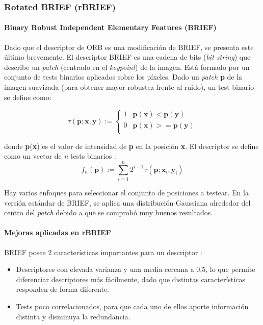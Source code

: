 \subsubsection{Rotated BRIEF (rBRIEF)}

\paragraph{Binary Robust Independent Elementary Features (BRIEF)}

Dado que el descriptor de ORB es una modificación de BRIEF, se presenta este último brevemente. El descriptor BRIEF \cite{Calonder12} es una cadena de bits (\textit{bit string}) que describe un \textit{patch} (centrado en el \textit{\textsl{keypoint}}) de la imagen. Está formado por un conjunto de tests binarios aplicados sobre los píxeles. Dado un \textit{patch} \textbf{p} de la imagen suavizada (para obtener mayor robustez frente al ruido), un test binario se define como:

\begin{equation}
\tau(\textbf{p}; \textbf{x}, \textbf{y}) := \left\lbrace
\begin{array}{cc}
1 & \textbf{p}(\textbf{x}) < \textbf{p}(\textbf{y}) \\
0 & \textbf{p}(\textbf{x}) >= \textbf{p}(\textbf{y}) \\
\end{array}
\right.
\end{equation}

donde \textbf{p}(\textbf{x}) es el valor de intensidad de \textbf{p} en la posición \textbf{x}.
El descriptor se define como un vector de \textsl{n} tests binarios :
\begin{equation}
f_{n}(\textbf{p}) := \sum_{i=1}^{n} 2^{i-1}\tau(\textbf{p}; \textbf{x}_{i}, \textbf{y}_{i})
\end{equation}

Hay varios enfoques para seleccionar el conjunto de posiciones a testear. En la versión estándar de BRIEF, se aplica una distribución Gaussiana alrededor del centro del \textit{patch} debido a que se comprobó muy buenos resultados.

\paragraph{Mejoras aplicadas en rBRIEF}

BRIEF posee 2 características importantes para un descriptor :
\begin{itemize}

\item Descriptores con elevada varianza y una media cercana a 0,5, lo que permite diferenciar descriptores más fácilmente, dado que distintas características responden de forma diferente.

\item Tests poco correlacionados, para que cada uno de ellos aporte información distinta y disminuya la redundancia.

\end{itemize}

